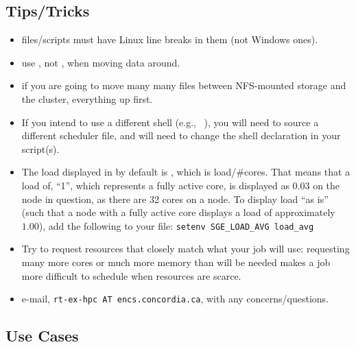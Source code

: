 \documentclass{easychair}
\begin{document}
\subsection{Tips/Tricks}

\begin{itemize}
\item
files/scripts must have Linux line breaks in them (not Windows ones).
\item
use , not , when moving data around. 
\item
if you are going to move many many files between NFS-mounted storage and the 
cluster,  everything up first. 
\item
If you intend to use a different shell (e.g., ~\cite{aosa-book-vol1-bash}), you will need to source a different scheduler file, and will need to change the shell declaration in your script(s).
\item
The load displayed in  by default is , which is load/\#cores. That means that a load of, ``1'', which represents a fully active core, is displayed as $0.03$ on the node in question, as there are 32 cores on a node. To display load ``as is'' (such that a node with a fully active core displays a load of approximately $1.00$), add the following to your  file: \texttt{setenv SGE\_LOAD\_AVG load\_avg}
\item
Try to request resources that closely match what your job will use: requesting many more cores or much more memory than will be needed makes a job more difficult to schedule when resources are scarce.
\item
e-mail, \texttt{rt-ex-hpc AT encs.concordia.ca}, with any concerns/questions.
\end{itemize}

\subsection{Use Cases}
\end{document}
